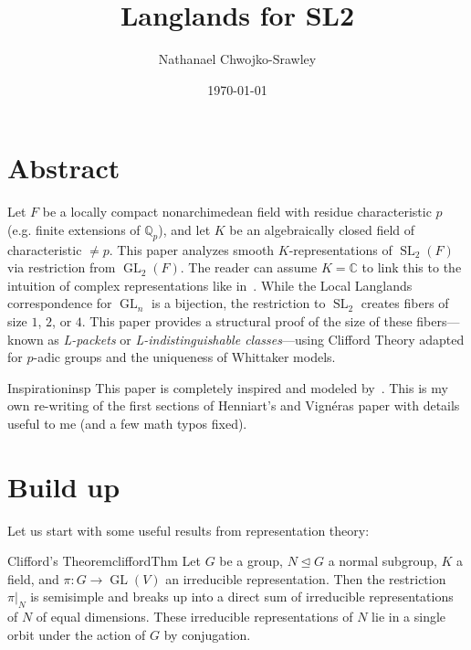 \documentclass{article}
\title{Langlands for SL2}
\author{Nathanael Chwojko-Srawley}
\date{\today}
\renewcommand{\maketitle}{
    \quad
    \vspace{1em}
  \begin{center}
      \LARGE\bfseries \thetitle \par
      \vspace{0.6em}
      \large
  \end{center}
    \vspace{1em}
}
\newcommand{\GL}{{\operatorname{GL}}}
\newcommand{\SL}{{\operatorname{SL}}}
\begin{document}
\maketitle

\section{Abstract}

Let $F$ be a locally compact nonarchimedean field with residue characteristic $p$ (e.g. finite extensions of
$\mathbb{Q}_p$), and let $K$ be an algebraically closed field of characteristic $\ne p$. This paper analyzes
smooth $K$-representations of $\SL_2(F)$ via restriction from $\GL_2(F)$. The reader can assume $K
= \mathbb{C}$ to link this to the intuition of complex representations like
in~\cite{bushnellLocalLanglandsConjecture2006}. While the Local Langlands correspondence for $\GL_n$ is
a bijection, the restriction to $\SL_2$ creates fibers of size $1$, $2$, or $4$. This paper provides a structural proof of the size of these fibers—known as \emph{L-packets} or \emph{L-indistinguishable classes}—using Clifford Theory adapted for $p$-adic groups and the uniqueness of Whittaker models.

\begin{titledBox}{Inspiration}{insp}
  This paper is completely inspired and modeled by~\cite{henniartRepresentationsSL2F2025}.
  This is my own re-writing of the first sections of Henniart's and Vign\'eras paper with details useful to
  me (and a few math typos fixed).
\end{titledBox}

\section{Build up}

Let us start with some useful results from representation theory:

\begin{thm}{Clifford's Theorem}{cliffordThm}
	Let $G$ be a group, $N \trianglelefteq G$ a normal subgroup, $K$ a field, and $\pi: G \to \GL(V)$ an irreducible
	representation. Then the restriction $\pi|_N$ is semisimple and breaks up into a direct sum of irreducible representations
	of $N$ of equal dimensions. These irreducible representations of $N$ lie in a single orbit under the action of $G$ by conjugation.
\end{thm}
\end{document}
